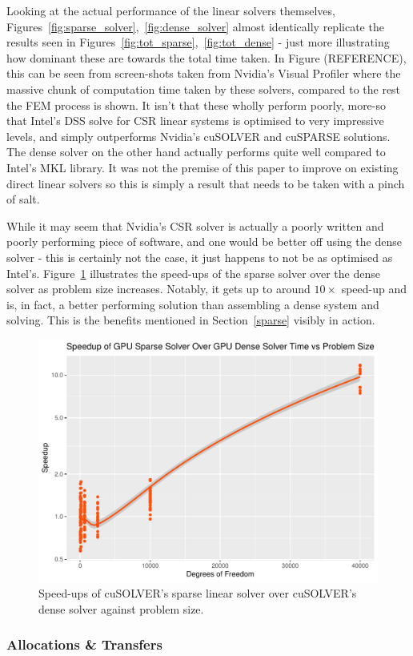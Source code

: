 Looking at the actual performance of the linear solvers themselves, Figures~\ref{fig:sparse_solver},~\ref{fig:dense_solver} almost identically replicate the results seen in Figures~\ref{fig:tot_sparse},~\ref{fig:tot_dense} - just more illustrating how dominant these are towards the total time taken. In Figure (REFERENCE), this can be seen from screen-shots taken from Nvidia's Visual Profiler where the massive chunk of computation time taken by these solvers, compared to the rest the FEM process is shown. It isn't that these wholly perform poorly, more-so that Intel's DSS solve for CSR linear systems is optimised to very impressive levels, and simply outperforms Nvidia's cuSOLVER and cuSPARSE solutions. The dense solver on the other hand actually performs quite well compared to Intel's MKL library. It was not the premise of this paper to improve on existing direct linear solvers so this is simply a result that needs to be taken with a pinch of salt.

While it may seem that Nvidia's CSR solver is actually a poorly written and poorly performing piece of software, and one would be better off using the dense solver - this is certainly not the case, it just happens to not be as optimised as Intel's. Figure~\ref{fig:gpu_solve} illustrates the speed-ups of the sparse solver over the dense solver as problem size increases. Notably, it gets up to around $10\times$ speed-up and is, in fact, a better performing solution than assembling a dense system and solving. This is the benefits mentioned in Section~\ref{sparse} visibly in action.

\begin{figure}
	\centering
	\includegraphics[width = 0.48\linewidth]{Plots/solve_gpus_speedup_vs_n}
	\caption{Speed-ups of cuSOLVER's sparse linear solver over cuSOLVER's dense solver against problem size.}
	\label{fig:gpu_solve}
\end{figure}

\subsubsection{Allocations \& Transfers}

